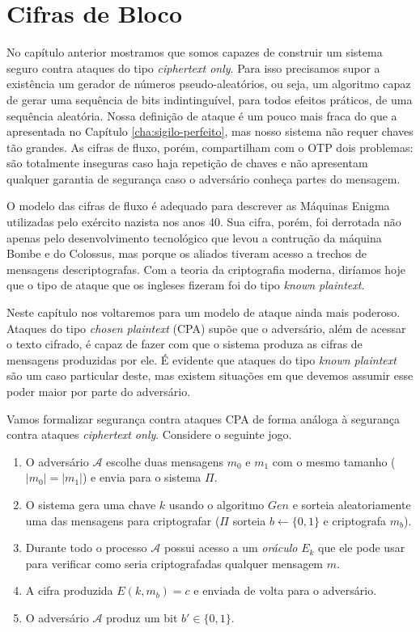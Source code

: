 \chapter{Cifras de Bloco}
\label{cha:cifras-de-bloco}

No capítulo anterior mostramos que somos capazes de construir um sistema seguro contra ataques do tipo {\em ciphertext only}.
Para isso precisamos supor a existência um gerador de números pseudo-aleatórios, ou seja, um algoritmo capaz de gerar uma sequência de bits indintinguível, para todos efeitos práticos, de uma sequência aleatória.
Nossa definição de ataque é um pouco mais fraca do que a apresentada no Capítulo \ref{cha:sigilo-perfeito}, mas nosso sistema não requer chaves tão grandes.
As cifras de fluxo, porém, compartilham com o OTP dois problemas: são totalmente inseguras caso haja repetição de chaves e não apresentam qualquer garantia de segurança caso o adversário conheça partes do mensagem.

O modelo das cifras de fluxo é adequado para descrever as Máquinas Enigma utilizadas pelo exército nazista nos anos 40.
Sua cifra, porém, foi derrotada não apenas pelo desenvolvimento tecnológico que levou a contrução da máquina Bombe e do Colossus, mas porque os aliados tiveram acesso a trechos de mensagens descriptografas.
Com a teoria da criptografia moderna, diríamos hoje que o tipo de ataque que os ingleses fizeram foi do tipo {\em known plaintext}.

Neste capítulo nos voltaremos para um modelo de ataque ainda mais poderoso.
Ataques do tipo {\em chosen plaintext} (CPA) supõe que o adversário, além de acessar o texto cifrado, é capaz de fazer com que o sistema produza as cifras de mensagens produzidas por ele.
É evidente que ataques do tipo {\em known plaintext} são um caso particular deste, mas existem situações em que devemos assumir esse poder maior por parte do adversário.

Vamos formalizar segurança contra ataques CPA de forma análoga à segurança contra ataques {\em ciphertext only}.
Considere o seguinte jogo.
\begin{enumerate}
\item O adversário $\mathcal{A}$ escolhe duas mensagens $m_0$ e $m_1$ com o mesmo tamanho ($|m_0| = |m_1|$) e envia para o sistema $\Pi$.
\item O sistema gera uma chave $k$ usando o algoritmo $Gen$ e sorteia aleatoriamente uma das mensagens para criptografar ($\Pi$ sorteia $b \leftarrow \{0, 1\}$ e criptografa $m_b$).
\item Durante todo o processo $\mathcal{A}$ possui acesso a um {\em oráculo} $E_k$ que ele pode usar para verificar como seria criptografadas qualquer mensagem $m$.
\item A cifra produzida $E(k, m_b) = c$ e enviada de volta para o adversário.
\item O adversário $\mathcal{A}$ produz um bit $b' \in \{0,1\}$.
\end{enumerate}

